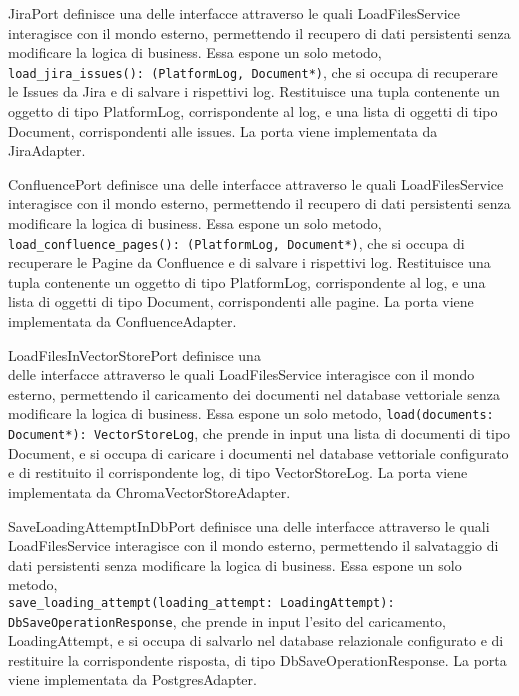 \label{sec:jira_port}
JiraPort definisce una delle interfacce attraverso le quali LoadFilesService interagisce con il mondo esterno, permettendo il recupero di dati persistenti senza modificare la logica di business. Essa espone un solo metodo, \texttt{load\_jira\_issues(): (PlatformLog, Document*)}, che si occupa di recuperare le Issues da Jira e di salvare i rispettivi log. Restituisce una tupla contenente un oggetto di tipo PlatformLog, corrispondente al log, e una lista di oggetti di tipo Document, corrispondenti alle issues. La porta viene implementata da JiraAdapter.

\label{sec:confluence_port}
ConfluencePort definisce una delle interfacce attraverso le quali LoadFilesService interagisce con il mondo esterno, permettendo il recupero di dati persistenti senza modificare la logica di business. Essa espone un solo metodo, \texttt{load\_confluence\_pages(): (PlatformLog, Document*)}, che si occupa di recuperare le Pagine da Confluence e di salvare i rispettivi log. Restituisce una tupla contenente un oggetto di tipo PlatformLog, corrispondente al log, e una lista di oggetti di tipo Document, corrispondenti alle pagine. La porta viene implementata da ConfluenceAdapter.

\label{sec:load_files_in_vector_store_port}
LoadFilesInVectorStorePort definisce una\\ delle interfacce attraverso le quali LoadFilesService interagisce con il mondo esterno, permettendo il caricamento dei documenti nel database vettoriale senza modificare la logica di business. Essa espone un solo metodo, \texttt{load(documents: Document*): VectorStoreLog}, che prende in input una lista di documenti di tipo Document, e si occupa di caricare i documenti nel database vettoriale configurato e di restituito il corrispondente log, di tipo VectorStoreLog. La porta viene implementata da ChromaVectorStoreAdapter.

\label{sec:save_loading_attempt_in_db_port}
SaveLoadingAttemptInDbPort definisce una delle interfacce attraverso le quali LoadFilesService interagisce con il mondo esterno, permettendo il salvataggio di dati persistenti senza modificare la logica di business. Essa espone un solo metodo,\\ \texttt{save\_loading\_attempt(loading\_attempt: LoadingAttempt): DbSaveOperationResponse}, che prende in input l'esito del caricamento, LoadingAttempt, e si occupa di salvarlo nel database relazionale configurato e di restituire la corrispondente risposta, di tipo DbSaveOperationResponse. La porta viene implementata da PostgresAdapter.

